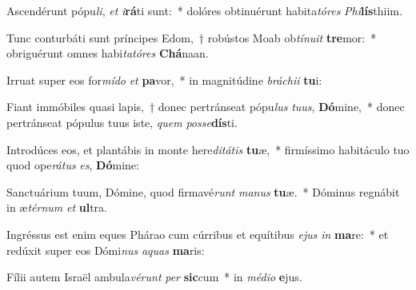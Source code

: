 \item Ascendérunt pópu\textit{li}, \textit{et} \textit{i}\textbf{rá}ti sunt:~* dolóres obtinuérunt habita\textit{tó}\textit{res} \textit{Phi}\textbf{lís}thiim.
\item Tunc conturbáti sunt príncipes Edom,~† robústos Moab ob\textit{tí}\textit{nu}\textit{it} \textbf{tre}mor:~* obriguérunt omnes habi\textit{ta}\textit{tó}\textit{res} \textbf{Chá}naan.
\item Irruat super eos for\textit{mí}\textit{do} \textit{et} \textbf{pa}vor,~* in magnitúdine \textit{brá}\textit{chi}\textit{i} \textbf{tu}i:
\item Fiant immóbiles quasi lapis,~† donec pertránseat pópu\textit{lus} \textit{tu}\textit{us}, \textbf{Dó}mine,~* donec pertránseat pópulus tuus iste, \textit{quem} \textit{pos}\textit{se}\textbf{dís}ti.
\item Introdúces eos, et plantábis in monte here\textit{di}\textit{tá}\textit{tis} \textbf{tu}æ,~* firmíssimo habitáculo tuo quod ope\textit{rá}\textit{tus} \textit{es}, \textbf{Dó}mine:
\item Sanctuárium tuum, Dómine, quod firmavé\textit{runt} \textit{ma}\textit{nus} \textbf{tu}æ.~* Dóminus regnábit in æ\textit{tér}\textit{num} \textit{et} \textbf{ul}tra.
\item Ingréssus est enim eques Phárao cum cúrribus et equítibus \textit{e}\textit{jus} \textit{in} \textbf{ma}re:~* et redúxit super eos Dómi\textit{nus} \textit{a}\textit{quas} \textbf{ma}ris:
\item Fílii autem Israël ambula\textit{vé}\textit{runt} \textit{per} \textbf{sic}cum~* in \textit{mé}\textit{di}\textit{o} \textbf{e}jus.
